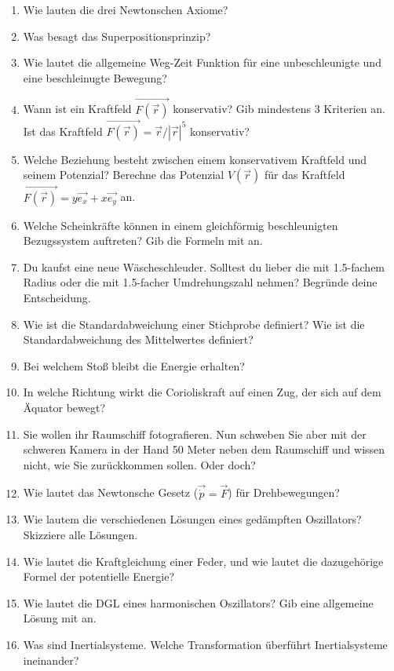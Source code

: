 




\begin{enumerate}
  \item Wie lauten die drei Newtonschen Axiome?
  \item Was besagt das Superpositionsprinzip?
  \item Wie lautet die allgemeine Weg-Zeit Funktion für eine unbeschleunigte
  und eine beschleinugte Bewegung?
  \item Wann ist ein Kraftfeld $\vec{F(\vec{r})}$ konservativ? Gib mindestens 3 Kriterien
  an. Ist das Kraftfeld $\vec{F(\vec{r})} = \vec{r}/|\vec{r}|^5$ konservativ?
  \item Welche Beziehung besteht zwischen einem konservativem Kraftfeld und seinem
  Potenzial? Berechne das Potenzial $V(\vec{r})$ für das Kraftfeld $\vec{F(\vec{r})}
  = y\vec{e_x} + x\vec{e_y}$ an.
  \item Welche Scheinkräfte können in einem gleichförmig beschleunigten Bezugssystem
  auftreten? Gib die Formeln mit an.
  \item Du kaufst eine neue Wäscheschleuder. Solltest du lieber die mit 1.5-fachem
  Radius oder die mit 1.5-facher Umdrehungszahl nehmen? Begründe deine Entscheidung.
  \item Wie ist die Standardabweichung einer Stichprobe definiert? Wie ist die
  Standardabweichung des Mittelwertes definiert?
  \item Bei welchem Stoß bleibt die Energie erhalten?
  \item In welche Richtung wirkt die Corioliskraft auf einen Zug, der sich auf
  dem Äquator bewegt?
  \item Sie wollen ihr Raumschiff fotografieren. Nun schweben Sie aber mit der
  schweren Kamera in der Hand 50 Meter neben dem Raumschiff und wissen nicht, wie
  Sie zurückkommen sollen. Oder doch?
  \item Wie lautet das Newtonsche Gesetz ($\vec{\dot{p}} = \vec{F}$) für Drehbewegungen?
  \item Wie lautem die verschiedenen Lösungen eines gedämpften Oszillators?
  Skizziere alle Lösungen.
  \item Wie lautet die Kraftgleichung einer Feder, und wie lautet die dazugehörige
  Formel der potentielle Energie?
  \item Wie lautet die DGL eines harmonischen Oszillators? Gib eine allgemeine
  Lösung mit an.
  \item Was sind Inertialsysteme. Welche Transformation überführt Inertialsysteme
  ineinander?
\end{enumerate}


